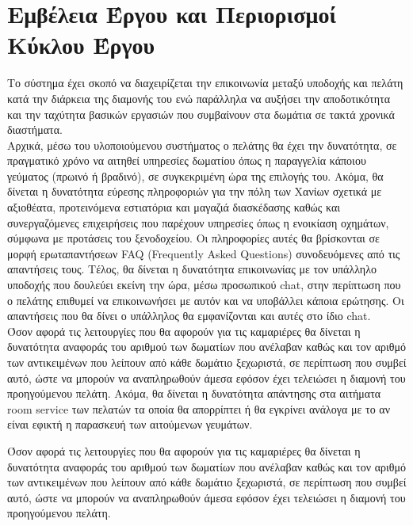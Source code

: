 \section{Εμβέλεια Έργου και Περιορισμοί Κύκλου Έργου}		
Το σύστημα έχει σκοπό να διαχειρίζεται την επικοινωνία μεταξύ υποδοχής και πελάτη κατά την διάρκεια 
της διαμονής του ενώ παράλληλα να αυξήσει την αποδοτικότητα και την ταχύτητα βασικών εργασιών 
που συμβαίνουν στα δωμάτια σε τακτά χρονικά διαστήματα.\\

\noindent
Αρχικά, μέσω του υλοποιούμενου συστήματος ο πελάτης θα έχει την δυνατότητα, σε πραγματικό χρόνο
να αιτηθεί υπηρεσίες δωματίου όπως η παραγγελία κάποιου γεύματος (πρωινό ή βραδινό), σε 
συγκεκριμένη ώρα της επιλογής του. Ακόμα, θα δίνεται η δυνατότητα εύρεσης πληροφοριών για την πόλη
των Χανίων σχετικά με αξιοθέατα, προτεινόμενα εστιατόρια και μαγαζιά διασκέδασης καθώς και  
συνεργαζόμενες επιχειρήσεις που παρέχουν υπηρεσίες όπως η ενοικίαση οχημάτων, σύμφωνα με 
προτάσεις του ξενοδοχείου. Οι πληροφορίες αυτές θα βρίσκονται σε μορφή ερωταπαντήσεων FAQ 
(Frequently Asked Questions) συνοδευόμενες από τις  απαντήσεις τους. Τέλος, θα δίνεται η δυνατότητα 
επικοινωνίας με τον υπάλληλο υποδοχής που δουλεύει εκείνη την ώρα, μέσω προσωπικού chat, στην 
περίπτωση που ο πελάτης επιθυμεί να επικοινωνήσει με αυτόν και να υποβάλλει κάποια ερώτησης. Οι 
απαντήσεις που θα δίνει ο υπάλληλος θα  εμφανίζονται και αυτές στο ίδιο chat. \\

\noindent
Όσον αφορά τις λειτουργίες που θα αφορούν για τις καμαριέρες θα δίνεται η δυνατότητα αναφοράς του
αριθμού των δωματίων που ανέλαβαν καθώς και τον αριθμό των αντικειμένων που λείπουν από κάθε 
δωμάτιο ξεχωριστά, σε περίπτωση που συμβεί αυτό, ώστε να μπορούν να αναπληρωθούν άμεσα εφόσον 
έχει τελειώσει η διαμονή του προηγούμενου πελάτη.  Ακόμα, θα δίνεται η δυνατότητα απάντησης στα
αιτήματα room service  των πελατών τα οποία θα απορρίπτει ή θα εγκρίνει ανάλογα με το αν είναι εφικτή
η παρασκευή των αιτούμενων γευμάτων.\\
\clearpage

\noindent
Όσον αφορά τις λειτουργίες που θα αφορούν για τις καμαριέρες θα δίνεται η δυνατότητα αναφοράς του
αριθμού των δωματίων που ανέλαβαν καθώς και τον αριθμό των αντικειμένων που λείπουν από κάθε 
δωμάτιο ξεχωριστά, σε περίπτωση που συμβεί αυτό, ώστε να μπορούν να αναπληρωθούν άμεσα εφόσον 
έχει τελειώσει η διαμονή του προηγούμενου πελάτη. \\

